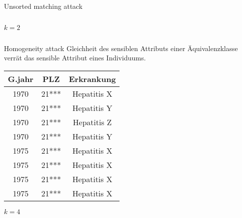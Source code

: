 \begin{frame} {Unsorted matching attack}
\begin{columns}[T]
\begin{column}[T]{0.5\textwidth}
			\(k = 2\)
	     \end{column}
     \end{columns}
	
\end{frame}


%
%


\begin{frame} {Homogeneity attack}
	Gleichheit des sensiblen Attributs einer Äquivalenzklasse verrät das sensible Attribut eines Individuums.
	\vspace{0.5cm}	

	\centering
	\small
	\begin{tabular}{|c|c|c|}
	\hline \textbf{G.jahr} & \textbf{PLZ} & \textbf{Erkrankung} \\
	\hline 1970 & 21*** & Hepatitis X \\ 
	 1970 & 21*** & Hepatitis Y \\ 
	 1970 & 21*** & Hepatitis Z \\ 
	 1970 & 21*** & Hepatitis Y \\ 
	\hline 1975 & 21*** & \cellcolor{svsrot}Hepatitis X \\ 
	 1975 & 21*** & \cellcolor{svsrot}Hepatitis X \\ 
	 1975 & 21*** & \cellcolor{svsrot}Hepatitis X \\ 
	 1975 & 21*** & \cellcolor{svsrot}Hepatitis X \\
	\hline 
	\end{tabular}
	\vspace{0.3cm}
	
	\centering
	\(k = 4\)
\end{frame}



